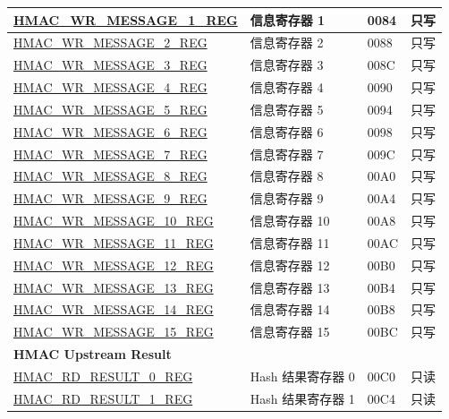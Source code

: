\begin{longtable}{ | p{6cm} | p{7.2cm} | p{1.3cm} | p{1cm} | }
\hyperref[regdesc:HMACWRMESSAGENREG]{HMAC\_WR\_MESSAGE\_1\_REG} & 信息寄存器 1 & \hexprefix{}0084 & 只写 \\ \hline
\hyperref[regdesc:HMACWRMESSAGENREG]{HMAC\_WR\_MESSAGE\_2\_REG} & 信息寄存器 2 & \hexprefix{}0088 & 只写 \\ \hline
\hyperref[regdesc:HMACWRMESSAGENREG]{HMAC\_WR\_MESSAGE\_3\_REG} & 信息寄存器 3 & \hexprefix{}008C & 只写 \\ \hline
\hyperref[regdesc:HMACWRMESSAGENREG]{HMAC\_WR\_MESSAGE\_4\_REG} & 信息寄存器 4 & \hexprefix{}0090 & 只写 \\ \hline
\hyperref[regdesc:HMACWRMESSAGENREG]{HMAC\_WR\_MESSAGE\_5\_REG} & 信息寄存器 5 & \hexprefix{}0094 & 只写 \\ \hline
\hyperref[regdesc:HMACWRMESSAGENREG]{HMAC\_WR\_MESSAGE\_6\_REG} & 信息寄存器 6 & \hexprefix{}0098 & 只写 \\ \hline
\hyperref[regdesc:HMACWRMESSAGENREG]{HMAC\_WR\_MESSAGE\_7\_REG} & 信息寄存器 7 & \hexprefix{}009C & 只写 \\ \hline
\hyperref[regdesc:HMACWRMESSAGENREG]{HMAC\_WR\_MESSAGE\_8\_REG} & 信息寄存器 8 & \hexprefix{}00A0 & 只写 \\ \hline
\hyperref[regdesc:HMACWRMESSAGENREG]{HMAC\_WR\_MESSAGE\_9\_REG} & 信息寄存器 9 & \hexprefix{}00A4 & 只写 \\ \hline
\hyperref[regdesc:HMACWRMESSAGENREG]{HMAC\_WR\_MESSAGE\_10\_REG} & 信息寄存器 10 & \hexprefix{}00A8 & 只写 \\ \hline
\hyperref[regdesc:HMACWRMESSAGENREG]{HMAC\_WR\_MESSAGE\_11\_REG} & 信息寄存器 11 & \hexprefix{}00AC & 只写 \\ \hline
\hyperref[regdesc:HMACWRMESSAGENREG]{HMAC\_WR\_MESSAGE\_12\_REG} & 信息寄存器 12 & \hexprefix{}00B0 & 只写 \\ \hline
\hyperref[regdesc:HMACWRMESSAGENREG]{HMAC\_WR\_MESSAGE\_13\_REG} & 信息寄存器 13 & \hexprefix{}00B4 & 只写 \\ \hline
\hyperref[regdesc:HMACWRMESSAGENREG]{HMAC\_WR\_MESSAGE\_14\_REG} & 信息寄存器 14 & \hexprefix{}00B8 & 只写 \\ \hline
\hyperref[regdesc:HMACWRMESSAGENREG]{HMAC\_WR\_MESSAGE\_15\_REG} & 信息寄存器 15 & \hexprefix{}00BC & 只写 \\ \hline
\multicolumn{4}{|l|}{\textbf{HMAC Upstream Result}} \\ \hline
\hyperref[regdesc:HMACRDRESULTNREG]{HMAC\_RD\_RESULT\_0\_REG} & Hash 结果寄存器 0 & \hexprefix{}00C0 & 只读 \\ \hline
\hyperref[regdesc:HMACRDRESULTNREG]{HMAC\_RD\_RESULT\_1\_REG} & Hash 结果寄存器 1 & \hexprefix{}00C4 & 只读 \\ \hline

\end{longtable}

